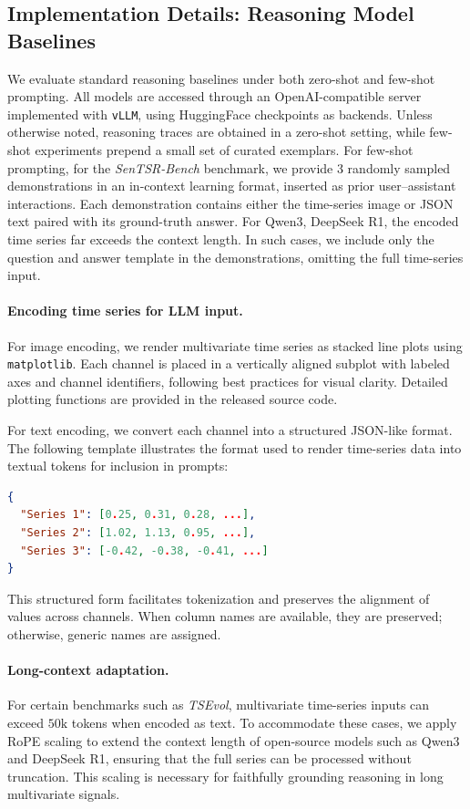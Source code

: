 \documentclass[twoside]{article}
\begin{document}
\subsection{Implementation Details: Reasoning Model Baselines}
\label{app:baseline-impl}

We evaluate standard reasoning baselines under both zero-shot and few-shot prompting. All models are accessed through an OpenAI-compatible server implemented with \texttt{vLLM}, using HuggingFace checkpoints as backends. Unless otherwise noted, reasoning traces are obtained in a zero-shot setting, while few-shot experiments prepend a small set of curated exemplars. For few-shot prompting, for the \emph{SenTSR-Bench} benchmark, we provide 3 randomly sampled demonstrations in an in-context learning format, inserted as prior user–assistant interactions. Each demonstration contains either the time-series image or JSON text paired with its ground-truth answer. For Qwen3, DeepSeek R1, the encoded time series far exceeds the context length. In such cases, we include only the question and answer template in the demonstrations, omitting the full time-series input.


\paragraph{Encoding time series for LLM input.} 
For image encoding, we render multivariate time series as stacked line plots using \texttt{matplotlib}. Each channel is placed in a vertically aligned subplot with labeled axes and channel identifiers, following best practices for visual clarity. Detailed plotting functions are provided in the released source code. 

For text encoding, we convert each channel into a structured JSON-like format. The following template illustrates the format used to render time-series data into textual tokens for inclusion in prompts:

\begin{lstlisting}[language=json, basicstyle=\ttfamily\small]
{
  "Series 1": [0.25, 0.31, 0.28, ...],
  "Series 2": [1.02, 1.13, 0.95, ...],
  "Series 3": [-0.42, -0.38, -0.41, ...]
}
\end{lstlisting}

This structured form facilitates tokenization and preserves the alignment of values across channels. When column names are available, they are preserved; otherwise, generic names are assigned.

\paragraph{Long-context adaptation.}  
For certain benchmarks such as \emph{TSEvol}, multivariate time-series inputs can exceed \(50\mathrm{k}\) tokens when encoded as text. To accommodate these cases, we apply RoPE scaling to extend the context length of open-source models such as Qwen3 and DeepSeek R1, ensuring that the full series can be processed without truncation. This scaling is necessary for faithfully grounding reasoning in long multivariate signals. 
\end{document}
